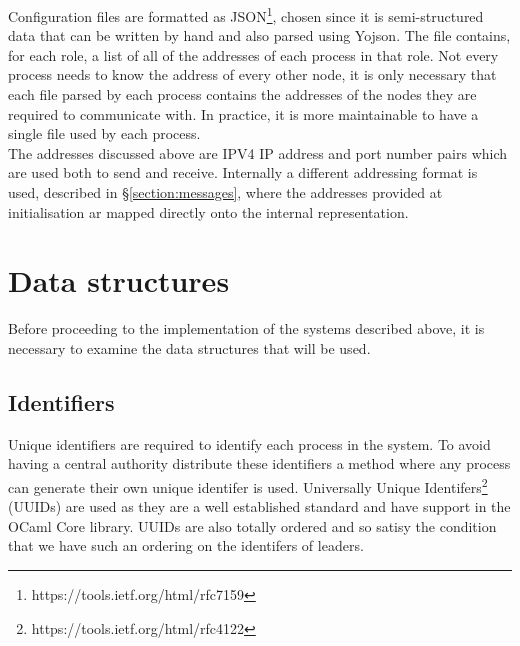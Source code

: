 Configuration files are formatted as JSON\footnote{https://tools.ietf.org/html/rfc7159}, chosen since it is semi-structured data that can be written by hand and also parsed using Yojson. The file contains, for each role, a list of all of the addresses of each process in that role. Not every process needs to know the address of every other node, it is only necessary that each file parsed by each process contains the addresses of the nodes they are required to communicate with. In practice, it is more maintainable to have a single file used by each process. \\

The addresses discussed above are IPV4 IP address and port number pairs which are used both to send and receive. Internally a different addressing format is used, described in \S\ref{section:messages}, where the addresses provided at initialisation ar mapped directly onto the internal representation. \\

\section{Data structures}

Before proceeding to the implementation of the systems described above, it is necessary to examine the data structures that will be used.

\subsection{Identifiers}

Unique identifiers are required to identify each process in the system. To avoid having a central authority distribute these identifiers a method where any process can generate their own unique identifer is used. Universally Unique Identifers\footnote{https://tools.ietf.org/html/rfc4122} (UUIDs) are used as they are a well established standard and have support in the OCaml Core library. UUIDs are also totally ordered and so satisy the condition that we have such an ordering on the identifers of leaders. \\


